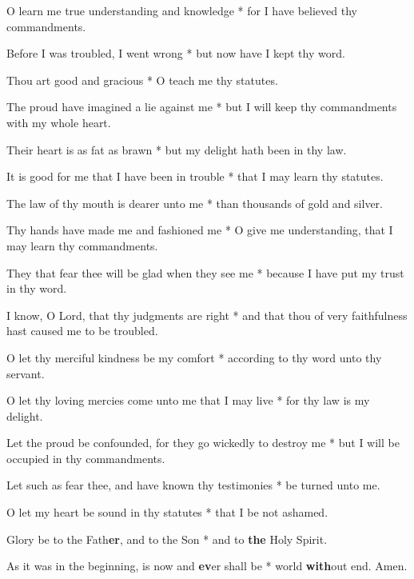 \begin{multicols}{2}
	O learn me true understanding and knowledge * for I have believed thy commandments.
	
	Before I was troubled, I went wrong * but now have I kept thy word.
	
	Thou art good and gracious * O teach me thy statutes.
	
	The proud have imagined a lie against me * but I will keep thy commandments with my whole heart.
	
	Their heart is as fat as brawn * but my delight hath been in thy law.
	
	It is good for me that I have been in trouble * that I may learn thy statutes.
	
	The law of thy mouth is dearer unto me * than thousands of gold and silver.
	
	Thy hands have made me and fashioned me * O give me understanding, that I may learn thy commandments.
	
	They that fear thee will be glad when they see me * because I have put my trust in thy word.
	
	I know, O Lord, that thy judgments are right * and that thou of very faithfulness hast caused me to be troubled.
	
	O let thy merciful kindness be my comfort * according to thy word unto thy servant.
	
	O let thy loving mercies come unto me that I may live * for thy law is my delight.
	
	Let the proud be confounded, for they go wickedly to destroy me * but I will be occupied in thy commandments.
	
	Let such as fear thee, and have known thy testimonies * be turned unto me.
	
	O let my heart be sound in thy statutes * that I be not ashamed.
	
	Glory be to the Fath\textbf{er}, and to the Son * and to \textbf{the} Holy Spirit.
	
	As it was in the beginning, is now and \textbf{ev}er shall be * world \textbf{with}out end. Amen.
\end{multicols}
